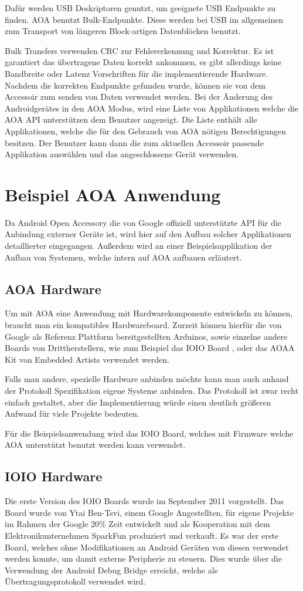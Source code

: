 \documentclass[12pt,journal,compsoc]{IEEEtran}
\begin{document}
Dafür werden USB Deskriptoren genutzt, um geeignete USB Endpunkte zu finden. AOA benutzt Bulk-Endpunkte. Diese werden bei USB im allgemeinen zum Transport von längeren Block-artigen Datenblöcken benutzt.

Bulk Transfers verwenden CRC zur Fehlererkennung und Korrektur. Es ist garantiert das übertragene Daten korrekt ankommen, es gibt allerdings keine Bandbreite oder Latenz Vorschriften für die implementierende Hardware.
\cite{usbbulk}
Nachdem die korrekten Endpunkte gefunden wurde, können sie von dem Accessoir zum senden von Daten verwendet werden.
Bei der Änderung des Androidgerätes in den AOA Modus, wird eine Liste von Applikationen welche die AOA API unterstützen dem Benutzer angezeigt. 
Die Liste enthält alle Applikationen, welche die für den Gebrauch von AOA nötigen Berechtigungen besitzen.
Der Benutzer kann dann die zum aktuellen Accessoir passende Applikation auswählen und das angeschlossene Gerät verwenden.

\section{Beispiel AOA Anwendung}
Da Android Open Accessory die von Google offiziell unterstützte API für die Anbindung externer Geräte ist, wird hier auf den Aufbau solcher Applikationen detaillierter eingegangen. Außerdem wird an einer Beispielsapplikation der Aufbau von Systemen, welche intern auf AOA aufbauen erläutert.
\subsection{AOA Hardware}
Um mit AOA eine Anwendung mit Hardwarekomponente entwickeln zu können, braucht man ein kompatibles Hardwareboard.
Zurzeit können hierfür die von Google als Referenz Plattform bereitgestellten Arduinos, sowie einzelne andere Boards von Drittherstellern, wie zum Beispiel das IOIO Board \cite{ioio}, oder das AOAA Kit von Embedded Artists\cite{aoaa} verwendet werden.

Falls man andere, spezielle Hardware anbinden möchte kann man auch anhand der Protokoll Spezifikation \cite{aoaprotocol2} eigene Systeme anbinden. 
Das Protokoll ist zwar recht einfach gestaltet, aber die Implementierung würde einen deutlich größeren Aufwand für viele Projekte bedeuten. 

Für die Beispielsanwendung wird das IOIO Board, welches mit Firmware welche AOA unterstützt benutzt werden kann verwendet.

\subsection{IOIO Hardware}
Die erste Version des IOIO Boards wurde im September 2011 vorgestellt. Das Board wurde von Ytai Ben-Tsvi, einem Google Angestellten, für eigene Projekte im Rahmen der Google 20\% Zeit entwickelt und als Kooperation mit dem Elektronikunternehmen SparkFun produziert und verkauft.
Es war der erste Board, welches ohne Modifikationen an Android Geräten von diesen verwendet werden konnte, um damit externe Peripherie zu steuern.
Dies wurde über die Verwendung der Android Debug Bridge erreicht, welche als Übertragungsprotokoll verwendet wird.
\end{document}
